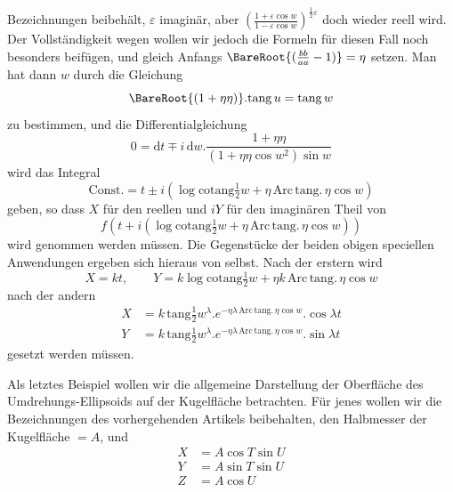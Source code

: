 Bezeichnungen beibehält, \(\varepsilon\) imaginär, aber \((\frac{1+\varepsilon\cos w}{1-\varepsilon\cos w})^{\frac{1}{2}\varepsilon}\) doch wieder reell wird. Der Vollständigkeit wegen wollen wir jedoch die Formeln für diesen Fall noch besonders beifügen, und gleich Anfangs \(\BareRoot{(\frac{bb}{aa}-1)}=\eta\) setzen. Man hat dann \(w\) durch die Gleichung
\[
\BareRoot{(1+\eta\eta)}\mathord{.}\mathrm{tang}\,u=\mathrm{tang}\,w
\]
\noindent zu bestimmen, und die Differentialgleichung
\[
0=\mathrm{d}t\mp i\,\mathrm{d}w\mathord{.}\frac{1+\eta\eta}{(1+\eta\eta\cos w^2)\sin w}
\]
\noindent wird das Integral
\[
\text{Const.}=t\pm i(\log\mathrm{cotang}\tfrac{1}{2}w+\eta\,\mathrm{Arc}\,\mathrm{tang}.\,\eta\cos w)
\]
\noindent geben, so dass \(X\) für den reellen und \(iY\) für den imaginären Theil von
\[
f(t+i(\log\mathrm{cotang}\tfrac{1}{2}w+\eta\,\mathrm{Arc}\,\mathrm{tang}.\,\eta\cos w))
\]
\noindent wird genommen werden müssen. Die Gegenstücke der beiden obigen speciellen Anwendungen ergeben sich hieraus von selbst. Nach der erstern wird
\[
X=kt,\qquad Y=k\log\mathrm{cotang}\tfrac{1}{2}w+\eta k\,\mathrm{Arc}\,\mathrm{tang}.\,\eta\cos w
\]
\noindent nach der andern
\[
\begin{aligned}
X&=k\,\mathrm{tang}\tfrac{1}{2}w^{\lambda}\mathord{.}e^{-\eta\lambda\,\mathrm{Arc}\,\mathrm{tang}.\,\eta\cos w}\mathord{.}\cos\lambda t\\
Y&=k\,\mathrm{tang}\tfrac{1}{2}w^{\lambda}\mathord{.}e^{-\eta\lambda\,\mathrm{Arc}\,\mathrm{tang}.\,\eta\cos w}\mathord{.}\sin\lambda t
\end{aligned}
\]
\noindent gesetzt werden müssen.

Als letztes Beispiel wollen wir die allgemeine Darstellung der Oberfläche des Umdrehungs-Ellipsoids auf der Kugelfläche betrachten. Für jenes wollen wir die Bezeichnungen des vorhergehenden Artikels beibehalten, den Halbmesser der Kugelfläche \(=A\), und
\[
\begin{aligned}
X&=A\cos T\sin U\\
Y&=A\sin T\sin U\\
Z&=A\cos U
\end{aligned}
\]
